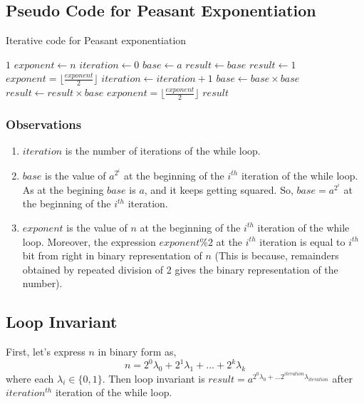 \documentclass[12pt]{article}
\begin{document}
\subsection*{Pseudo Code for Peasant Exponentiation}
\begin{algorithm}[H]
    \caption{Iterative code for Peasant exponentiation}
    \begin{algorithmic}[1]
            \State \Return $1$
        \EndIf
        \State $exponent \gets n$
        \State $iteration \gets 0$
        \State $base \gets a$
            \State $result \gets base$
        \Else
            \State $result \gets 1$
        \EndIf
        \State $exponent = \lfloor \frac{exponent}{2} \rfloor$
            \State $iteration \gets iteration + 1$
            \State $base \gets base \times base$
                \State $result \gets result \times base$
            \EndIf
            \State $exponent = \lfloor \frac{exponent}{2} \rfloor$
        \EndWhile
        \State \Return $result$
        \EndFunction
    \end{algorithmic}
\end{algorithm}

\subsubsection*{Observations}
\begin{enumerate}
    \item $iteration$ is the number of iterations of the while loop.
    \item $base$ is the value of $a^{2^i}$ at the beginning of the $i^{th}$ iteration of the while loop. As at the begining $base$ is $a$, and it keeps getting squared. So, $base = a^{2^i}$ at the beginning of the $i^{th}$ iteration.
    \item $exponent$ is the value of $n$ at the beginning of the $i^{th}$ iteration of the while loop. Moreover, the expression $exponent\%2$ at the $i^{th}$ iteration is equal to $i^{th}$ bit from right in binary representation of $n$ (This is because, remainders obtained by repeated division of 2 gives the binary representation of the number).
\end{enumerate}

\subsection*{Loop Invariant}
First, let's express $n$ in binary form as,
$$n = 2^0\lambda_0 + 2^1\lambda_1 + \ldots + 2^k\lambda_k$$
where each $\lambda_i \in \{0,1\}$. Then loop invariant is $result = a^{2^0\lambda_0 + \ldots 2^{iteration}\lambda_{iteration}}$ after $iteration^{th}$ iteration of the while loop.
\end{document}
